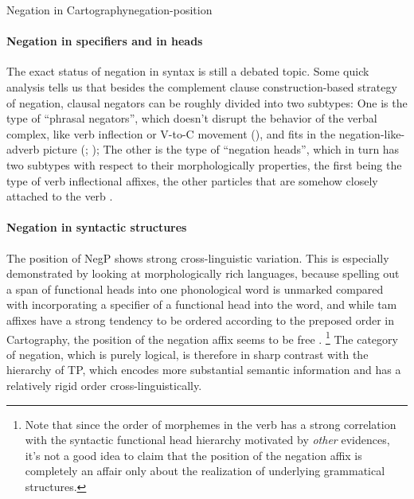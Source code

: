 \documentclass[UTF8, a4paper, oneside, scheme=plain]{ctexrep}
\newcommand*{\citesec}[1]{\S~{#1}}
\newcommand*{\citepage}[1]{p.~{#1}}
\begin{document}
\begin{theorybox}{Negation in Cartography}{negation-position}
    \paragraph*{Negation in specifiers and in heads}
    The exact status of negation in syntax is still a debated topic.
    Some quick analysis tells us that besides 
    the complement clause construction-based strategy of negation,
    clausal negators can be roughly divided into two subtypes:
    One is the type of ``phrasal negators'',
    which doesn't disrupt the behavior of the verbal complex,
    like verb inflection or V-to-C movement (),
    and fits in the negation-like-adverb picture 
    (\citealt[\citepage{101}]{zanuttini1997negation};
    \citealt[\citesec{4.7}]{radford2009analysing});
    The other is the type of ``negation heads'',
    which in turn has two subtypes with respect to their morphologically properties,
    the first being the type of verb inflectional affixes,
    the other particles that are somehow closely attached to the verb \citep{zeijlstra2013}.    

    \paragraph*{Negation in syntactic structures} 
    The position of NegP shows strong cross-linguistic variation.
    This is especially demonstrated by looking at morphologically rich languages,
    because spelling out a span of functional heads into one phonological word
    is unmarked compared with incorporating a specifier of a functional head 
    into the word,
    and while \acs{tam} affixes have a strong tendency to be ordered 
    according to the preposed order in Cartography, 
    the position of the negation affix seems to be free \citep[\citepage{15}]{moscati2010negation}.%
    \footnote{
        Note that since the order of morphemes in the verb has a strong correlation 
        with the syntactic functional head hierarchy motivated by \emph{other} evidences,
        it's not a good idea to claim that the position of the negation affix 
        is completely an affair only about the realization of underlying grammatical structures.
    }
    The category of negation, which is purely logical, is therefore in sharp contrast with 
    the hierarchy of TP, 
    which encodes more substantial semantic information
    and has a relatively rigid order cross-linguistically.


\end{theorybox}
\end{document}
